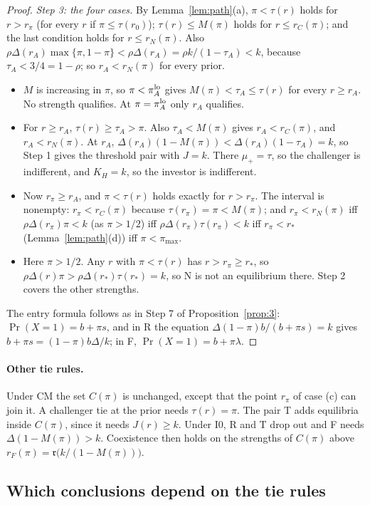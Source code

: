 \documentclass[11pt]{article}
\theoremstyle{definition}
\newcommand{\fr}{\mathfrak r}
\begin{document}
\begin{proof}
\emph{Step 3: the four cases.} By Lemma~\ref{lem:path}(a), $\pi<\tau(r)$ holds for $r>r_\pi$ (for every $r$ if
$\pi\le\tau(r_0)$); $\tau(r)\le M(\pi)$ holds for $r\le r_C(\pi)$; and the last condition holds for $r\le r_N(\pi)$.
Also $\rho\Delta(r_A)\max\{\pi,1-\pi\}<\rho\Delta(r_A)=\rho k/(1-\tau_A)<k$, because $\tau_A<3/4=1-\rho$; so
$r_A<r_N(\pi)$ for every prior.
\begin{itemize}
\item[(a)] $M$ is increasing in $\pi$, so $\pi<\pi_A^{\rm lo}$ gives $M(\pi)<\tau_A\le\tau(r)$ for every $r\ge r_A$.
  No strength qualifies. At $\pi=\pi_A^{\rm lo}$ only $r_A$ qualifies.
\item[(b)] For $r\ge r_A$, $\tau(r)\ge\tau_A>\pi$. Also $\tau_A<M(\pi)$ gives $r_A<r_C(\pi)$, and $r_A<r_N(\pi)$.
  At $r_A$, $\Delta(r_A)(1-M(\pi))<\Delta(r_A)(1-\tau_A)=k$, so Step 1 gives the threshold pair with $J=k$.
  There $\mu_+=\tau$, so the challenger is indifferent, and $K_H=k$, so the investor is indifferent.
\item[(c)] Now $r_\pi\ge r_A$, and $\pi<\tau(r)$ holds exactly for $r>r_\pi$. The interval is nonempty: $r_\pi<r_C(\pi)$
  because $\tau(r_\pi)=\pi<M(\pi)$; and $r_\pi<r_N(\pi)$ iff $\rho\Delta(r_\pi)\pi<k$ (as $\pi>1/2$) iff
  $\rho\Delta(r_\pi)\tau(r_\pi)<k$ iff $r_\pi<r_*$ (Lemma~\ref{lem:path}(d)) iff $\pi<\pi_{\max}$.
\item[(d)] Here $\pi>1/2$. Any $r$ with $\pi<\tau(r)$ has $r>r_\pi\ge r_*$, so
  $\rho\Delta(r)\pi>\rho\Delta(r_*)\tau(r_*)=k$, so N is not an equilibrium there. Step 2 covers the
  other strengths.
\end{itemize}
The entry formula follows as in Step 7 of Proposition~\ref{prop:3}: $\Pr(X=1)=b+\pi s$, and in R the equation
$\Delta(1-\pi)b/(b+\pi s)=k$ gives $b+\pi s=(1-\pi)b\Delta/k$; in F, $\Pr(X=1)=b+\pi\lambda$.
\end{proof}

\paragraph{Other tie rules.} Under CM the set $C(\pi)$ is unchanged, except that the point $r_\pi$ of case (c) can
join it. A challenger tie at the prior needs $\tau(r)=\pi$. The pair T adds equilibria inside $C(\pi)$, since it
needs $J(r)\ge k$. Under I0, R and T drop out and F needs $\Delta(1-M(\pi))>k$. Coexistence then holds on the
strengths of $C(\pi)$ above $r_F(\pi)=\fr\big(k/(1-M(\pi))\big)$.

\subsection{Which conclusions depend on the tie rules}
\end{document}
